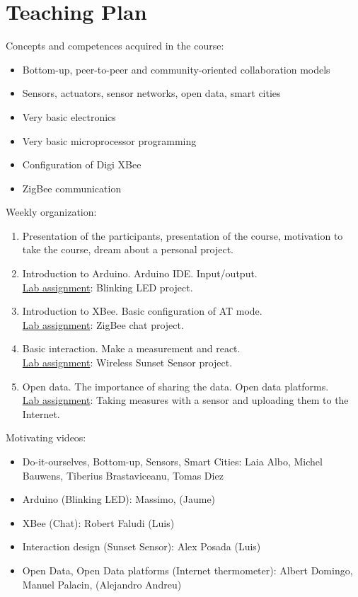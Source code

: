 \documentclass{tufte-book} %
\begin{document}

\chapter{Teaching Plan}

 Concepts and competences acquired in the course:
\begin{itemize}
\item Bottom-up, peer-to-peer and community-oriented collaboration models
\item Sensors, actuators, sensor networks, open data, smart cities
\item Very basic electronics
\item Very basic microprocessor programming
\item Configuration of Digi XBee
\item ZigBee communication
\end{itemize}

Weekly organization:
\begin{enumerate}
\item Presentation of the participants, presentation of the course, motivation to take the course, dream about a personal project.
\item Introduction to Arduino. Arduino IDE. Input/output. \\\underline{Lab assignment}: Blinking LED project.
\item Introduction to XBee. Basic configuration of AT mode. \\\underline{Lab assignment}: ZigBee chat project.
\item Basic interaction. Make a measurement and react. \\\underline{Lab assignment}: Wireless Sunset Sensor project.
\item Open data. The importance of sharing the data. Open data platforms. \\\underline{Lab assignment}: Taking measures with a sensor and uploading them to the Internet.
\end{enumerate}

Motivating videos:
\begin{itemize}
\item Do-it-ourselves, Bottom-up, Sensors, Smart Cities:
Laia Albo, Michel Bauwens, Tiberius Brastaviceanu, Tomas Diez

\item Arduino (Blinking LED):
Massimo, (Jaume)

\item XBee (Chat):
Robert Faludi (Luis)

\item Interaction design (Sunset Sensor):
Alex Posada (Luis)

\item Open Data, Open Data platforms (Internet thermometer):
Albert Domingo, Manuel Palacin, (Alejandro Andreu)
\end{itemize}
\end{document}
